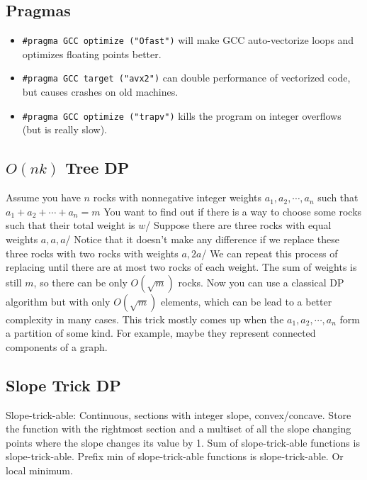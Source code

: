 	\subsection{Pragmas}
		\begin{itemize}
			\item \lstinline{#pragma GCC optimize ("Ofast")} will make GCC auto-vectorize loops and optimizes floating points better.
			\item \lstinline{#pragma GCC target ("avx2")} can double performance of vectorized code, but causes crashes on old machines.
			\item \lstinline{#pragma GCC optimize ("trapv")} kills the program on integer overflows (but is really slow).
		\end{itemize}
	

	\subsection{$O(nk)$ Tree DP}
	Assume you have $n$ rocks with nonnegative integer weights $a_1,a_2,\cdots,a_n$ such that $a_1+a_2+\cdots+a_n=m$
	You want to find out if there is a way to choose some rocks such that their total weight is $w$/
	Suppose there are three rocks with equal weights $a,a,a$/
	Notice that it doesn't make any difference if we replace these three rocks with two rocks with weights $a,2a$/
	We can repeat this process of replacing until there are at most two rocks of each weight. The sum of weights is still $m$,
	so there can be only $O(\sqrt{m})$ rocks. Now you can use a classical DP algorithm but with only $O(\sqrt{m})$
	elements, which can be lead to a better complexity in many cases.
	This trick mostly comes up when the $a_1,a_2,\cdots,a_n$ form a partition of some kind. 
	For example, maybe they represent connected components of a graph.
	\subsection{Slope Trick DP}
	Slope-trick-able: Continuous, sections with integer slope, convex/concave.
	Store the function with the rightmost section and a multiset of all the slope changing points where the slope changes its value by 1.
	Sum of slope-trick-able functions is slope-trick-able.
	Prefix min of slope-trick-able functions is slope-trick-able. Or local minimum.
